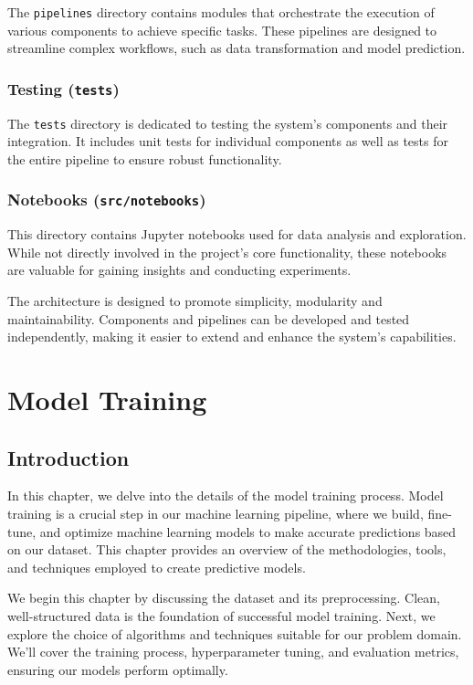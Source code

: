 \documentclass{report}
\begin{document}
The \texttt{pipelines} directory contains modules that orchestrate the execution of various components to achieve specific tasks. These pipelines are designed to streamline complex workflows, such as data transformation and model prediction.

\subsection{Testing (\texttt{tests})}

The \texttt{tests} directory is dedicated to testing the system's components and their integration. It includes unit tests for individual components as well as tests for the entire pipeline to ensure robust functionality.

\subsection{Notebooks (\texttt{src/notebooks})}

This directory contains Jupyter notebooks used for data analysis and exploration. While not directly involved in the project's core functionality, these notebooks are valuable for gaining insights and conducting experiments.

The architecture is designed to promote simplicity, modularity and maintainability. Components and pipelines can be developed and tested independently, making it easier to extend and enhance the system's capabilities.
\chapter{Model Training}
\section{Introduction}

In this chapter, we delve into the details of the model training process. Model training is a crucial step in our machine learning pipeline, where we build, fine-tune, and optimize machine learning models to make accurate predictions based on our dataset. This chapter provides an overview of the methodologies, tools, and techniques employed to create predictive models.

We begin this chapter by discussing the dataset and its preprocessing. Clean, well-structured data is the foundation of successful model training. Next, we explore the choice of algorithms and techniques suitable for our problem domain. We'll cover the training process, hyperparameter tuning, and evaluation metrics, ensuring our models perform optimally.
\end{document}
